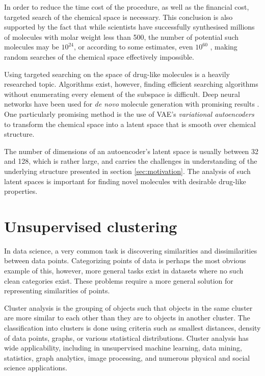 In order to reduce the time cost of the procedure, as well as the financial cost, targeted search of the chemical space is necessary. This conclusion is also supported by the fact that while scientists have successfully synthesised millions of molecules with molar weight less than 500, the number of potential such molecules may be $10^{24}$, or according to some estimates, even $10^{60}$ \cite{bib:1060}, making random searches of the chemical space effectively impossible.

Using targeted searching on the space of drug-like molecules is a heavily researched topic. Algorithms exist, however, finding efficient searching algorithms without enumerating every element of the subspace is difficult. Deep neural networks have been used for \textit{de novo} molecule generation with promising results \cite{bib:molsearch}. One particularly promising method is the use of VAE's \textit{variational autoencoders} \cite{bib:vae} to transform the chemical space into a latent space that is smooth over chemical structure.

The number of dimensions of an autoencoder's latent space is usually between 32 and 128, which is rather large, and carries the challenges in understanding of the underlying structure presented in section \ref{sec:motivation}. The analysis of such latent spaces is important for finding novel molecules with desirable drug-like properties.

\section{Unsupervised clustering}\label{sec:unsupervised-clustering}

In data science, a very common task is discovering similarities and dissimilarities between data points. Categorizing points of data is perhaps the most obvious example of this, however, more general tasks exist in datasets where no such clean categories exist. These problems require a more general solution for representing similarities of points.

Cluster analysis is the grouping of objects such that objects in the same cluster are more similar to each other than they are to objects in another cluster. The classification into clusters is done using criteria such as smallest distances, density of data points, graphs, or various statistical distributions. Cluster analysis has  wide applicability, including in unsupervised machine learning, data mining, statistics, graph analytics,  image processing, and numerous physical and social science applications.

